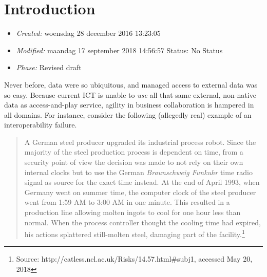 \documentclass[a4paper,11pt,oneside,oldfontcommands]{memoir}
\theoremstyle{definition}
\theoremstyle{break}		%
\numberwithin{equation}{chapter}
\numberwithin{figure}{chapter}
\begin{document}



%





\hypertarget{introduction}{%
\chapter{Introduction}\label{introduction}}

\begin{itemize}
\tightlist
\item
  \emph{Created:} woensdag 28 december 2016 13:23:05
\item
  \emph{Modified:} maandag 17 september 2018 14:56:57 Status: No Status
\item
  \emph{Phase:} Revised draft
\end{itemize}

Never before, data were so ubiquitous, and managed access to external
data was so easy. Because current ICT is unable to \emph{use} all that
same external, non-native data as access-and-play service, agility in
business collaboration is hampered in all domains. For instance,
consider the following (allegedly real) example of an interoperability
failure.

\begin{quote}
A German steel producer upgraded its industrial process robot. Since the
majority of the steel production process is dependent on time, from a
security point of view the decision was made to not rely on their own
internal clocks but to use the German \emph{Braunschweig Funkuhr} time
radio signal as source for the exact time instead. At the end of April
1993, when Germany went on summer time, the computer clock of the steel
producer went from 1:59 AM to 3:00 AM in one minute. This resulted in a
production line allowing molten ingots to cool for one hour less than
normal. When the process controller thought the cooling time had
expired, his actions splattered still-molten steel, damaging part of the
facility.\footnote{Source:
  http://catless.ncl.ac.uk/Risks/14.57.html\#subj1, accessed May 20,
  2018}
\end{quote}
\end{document}
